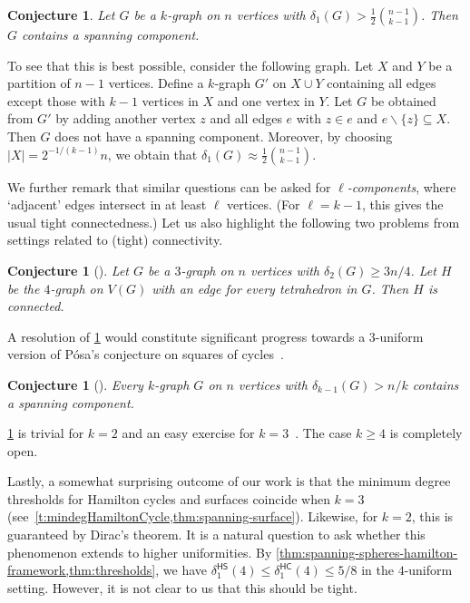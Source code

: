 \documentclass[12pt,reqno]{amsart}
\let\setminus=\smallsetminus
\theoremstyle{plain}
\newtheorem{conjecture}[theorem]{Conjecture}
\theoremstyle{definition}
\numberwithin{equation}{section}
\newcommand{\sm}{\setminus}
\renewcommand{\subset}{\subseteq}
\DeclareMathOperator{\ham}{\mathsf{HC}}
\DeclareMathOperator{\hs}{\mathsf{HS}}
\begin{document}
	\begin{conjecture}
		Let $G$ be a $k$-graph on $n$ vertices with $\delta_1(G) > \tfrac{1}{2}\binom{n-1}{k-1}$.
		Then $G$ contains a spanning component.
	\end{conjecture}
	
	To see that this is best possible, consider the following graph.
	Let $X$ and $Y$ be a partition of $n-1$ vertices.
	Define a $k$-graph $G'$ on $X \cup Y$ containing all edges except those with $k-1$ vertices in $X$ and one vertex in $Y$.
	Let $G$ be obtained from $G'$ by adding another vertex $z$ and all edges $e$ with $z \in e$ and $e \sm \{z\}\subset X$.
	Then $G$ does not have a spanning component.
	Moreover, by choosing $|X| =  2^{-1/(k-1)}n$, we obtain that $\delta_1(G) \approx \tfrac{1}{2} \binom{n-1}{k-1}$.
	
	We further remark that similar questions can be asked for \emph{$\ell$-components}, where `adjacent' edges intersect in at least $\ell$ vertices.
	(For $\ell=k-1$, this gives the usual tight connectedness.)
	Let us also highlight the following two problems from settings related to (tight) connectivity.
	
	\begin{conjecture}[{\cite[Conjecture 12.3]{LS24a}}]\label{con:tetrahedron}
		Let $G$ be a $3$-graph on $n$ vertices with $\delta_2(G) \geq 3 n / 4$.
		Let $H$ be the $4$-graph on $V(G)$ with an edge for every tetrahedron in $G$.
		Then $H$ is connected.
	\end{conjecture}
	
	A resolution of \cref{con:tetrahedron} would constitute significant progress towards a $3$-uniform version of Pósa's conjecture on squares of cycles~\cite[Section 12.3]{LS24a}.
	
	\begin{conjecture}[{\cite[Conjecture 5.2]{Min2DegSS}}]\label{con:codegree}
		Every $k$-graph $G$ on $n$ vertices with $\delta_{k-1}(G) > n/k$ contains a spanning component.
	\end{conjecture}
	
	\cref{con:codegree} is trivial for $k=2$ and an easy exercise for $k = 3$~\cite{Min2DegSS}.
	The case $k\geq 4$ is completely open.
	
	Lastly, a somewhat surprising outcome of our work is that the minimum degree thresholds for Hamilton cycles and surfaces coincide when $k=3$ (see~\cref{t:mindegHamiltonCycle,thm:spanning-surface}).
	Likewise, for $k=2$, this is guaranteed by Dirac's theorem.
	It is a natural question to ask whether this phenomenon extends to higher uniformities.
	By \cref{thm:spanning-spheres-hamilton-framework,thm:thresholds}, we have $\delta_1^{\hs}(4) \leq \delta_1^{\ham}(4) \leq 5/8$  in the $4$-uniform setting.
	However, it is not clear to us that this should be tight.
	
\end{document}
